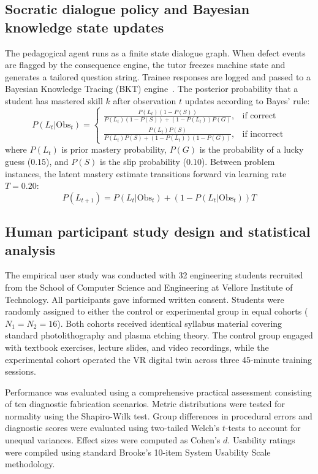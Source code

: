 \documentclass[10pt,a4paper,twocolumn]{article}
\begin{document}
\subsection*{Socratic dialogue policy and Bayesian knowledge state updates}
The pedagogical agent runs as a finite state dialogue graph. When defect events are flagged by the consequence engine, the tutor freezes machine state and generates a tailored question string. Trainee responses are logged and passed to a Bayesian Knowledge Tracing (BKT) engine~\cite{corbett2001knowledge}. The posterior probability that a student has mastered skill $k$ after observation $t$ updates according to Bayes' rule:
\begin{equation}
P(L_t | \text{Obs}_t) = 
\begin{cases} 
\frac{P(L_t)(1 - P(S))}{P(L_t)(1 - P(S)) + (1 - P(L_t))P(G)}, & \text{if correct} \\[0.8em]
\frac{P(L_t) P(S)}{P(L_t) P(S) + (1 - P(L_t))(1 - P(G))}, & \text{if incorrect}
\end{cases}
\label{eq:bkt_update}
\end{equation}
where $P(L_t)$ is prior mastery probability, $P(G)$ is the probability of a lucky guess ($0.15$), and $P(S)$ is the slip probability ($0.10$). Between problem instances, the latent mastery estimate transitions forward via learning rate $T = 0.20$:
\begin{equation}
P(L_{t+1}) = P(L_t | \text{Obs}_t) + \left(1 - P(L_t | \text{Obs}_t)\right) T
\label{eq:bkt_trans}
\end{equation}

\subsection*{Human participant study design and statistical analysis}
The empirical user study was conducted with 32 engineering students recruited from the School of Computer Science and Engineering at Vellore Institute of Technology. All participants gave informed written consent. Students were randomly assigned to either the control or experimental group in equal cohorts ($N_1 = N_2 = 16$). Both cohorts received identical syllabus material covering standard photolithography and plasma etching theory. The control group engaged with textbook exercises, lecture slides, and video recordings, while the experimental cohort operated the VR digital twin across three 45-minute training sessions.

Performance was evaluated using a comprehensive practical assessment consisting of ten diagnostic fabrication scenarios. Metric distributions were tested for normality using the Shapiro-Wilk test. Group differences in procedural errors and diagnostic scores were evaluated using two-tailed Welch's $t$-tests to account for unequal variances. Effect sizes were computed as Cohen's $d$. Usability ratings were compiled using standard Brooke's 10-item System Usability Scale methodology.
\end{document}
